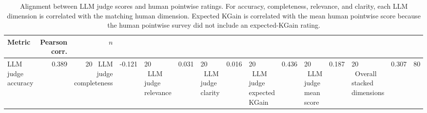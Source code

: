 \begin{table}[t]
\centering
\small
\begin{tabular}{lrr}
\toprule
Metric & Pearson corr. & $n$ \\
\midrule
LLM judge accuracy & 0.389 & 20 \
LLM judge completeness & -0.121 & 20 \
LLM judge relevance & 0.031 & 20 \
LLM judge clarity & 0.016 & 20 \
LLM judge expected KGain & 0.436 & 20 \
LLM judge mean score & 0.187 & 20 \
Overall stacked dimensions & 0.307 & 80 \
\bottomrule
\end{tabular}
\caption{Alignment between LLM judge scores and human pointwise ratings. For accuracy, completeness, relevance, and clarity, each LLM dimension is correlated with the matching human dimension. Expected KGain is correlated with the mean human pointwise score because the human pointwise survey did not include an expected-KGain rating.}
\label{tab:human_llm_judge_alignment}
\end{table}
